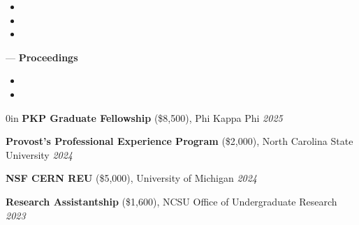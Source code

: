 \documentclass{cv}
\begin{document}

\vspace{0.3em}
\vspace{-0.6em}

\begin{itemize}[leftmargin=1.3em]
    \setlength\itemsep{-0.1em}
    \item {}
    \item {}
    \item {}
\end{itemize}

\vspace{-0.3em}
{\large--- {\bfseries Proceedings}}
\vspace{-0.6em}

\begin{itemize}[leftmargin=1.3em]
    \setlength\itemsep{-0.1em}
    \item {}
    \item {}
\end{itemize}
\vspace{-0.3em}


\begin{adjustwidth}{\spacing}{0in}
    \textbf{PKP Graduate Fellowship} (\$8,500),
    Phi Kappa Phi
    \hfill \textsl{2025}

    \textbf{Provost's Professional Experience Program} (\$2,000),
    North Carolina State University
    \hfill \textsl{2024}

    \textbf{NSF CERN REU} (\$5,000),
    University of Michigan
    \hfill \textsl{2024}

    \textbf{Research Assistantship} (\$1,600),
    NCSU Office of Undergraduate Research
    \hfill \textsl{2023}
\end{adjustwidth}
\vspace{0.6em}



\vspace{0.3em}


\vspace{0.2em}

\vspace{0.6em}

\end{document}
